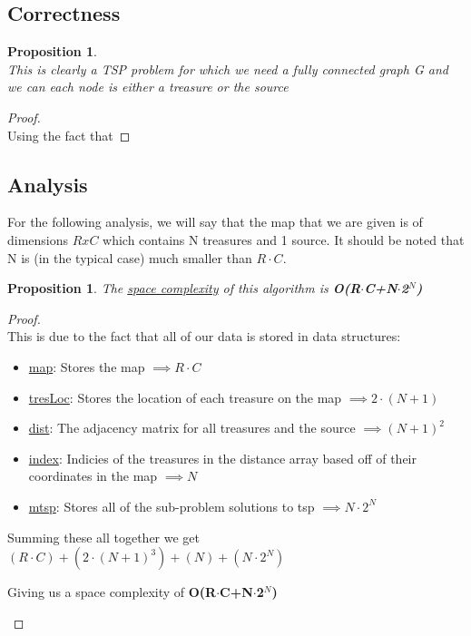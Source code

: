 \documentclass[12pt]{article}
\newtheorem{proposition}[theorem]{Proposition}
\begin{document}

\subsection{Correctness}
\begin{proposition}
~ \\ \indent This is clearly a TSP problem for which we need a fully connected graph G
and we can each node is either a treasure or the source
\end{proposition}

\begin{proof}
~ \\ \indent Using the fact that 
\end{proof}


\subsection{Analysis}
For the following analysis, we will say that the map that we are given is of dimensions
$RxC$ which contains N treasures and 1 source. It should be noted that N is (in the typical case)
much smaller than $R\cdot C$.


\begin{proposition}
\label{numq}
The \underline{space complexity} of this algorithm is \textbf{O(R$\cdot$C+N$\cdot$2$^N$)}
\end{proposition}

\begin{proof}
~ \\ \indent This is due to the fact that all of our data is stored in data structures:
\begin{itemize}
    \item \underline{map}: Stores the map $\implies R\cdot C$
    \item \underline{tresLoc}: Stores the location of each treasure on the map $\implies 2\cdot (N+1)$
    \item \underline{dist}: The adjacency matrix for all treasures and the source $\implies (N+1)^2$
    \item \underline{index}: Indicies of the treasures in the distance array based off of
            their coordinates in the map $\implies N$
    \item \underline{mtsp}: Stores all of the sub-problem solutions to tsp $\implies N\cdot 2^N$
\end{itemize}
Summing these all together we get $(R\cdot C) + (2\cdot(N+1)^3) + (N) + (N\cdot2^N)$
\begin{center}
    Giving us a space complexity of \textbf{O(R$\cdot$C+N$\cdot$2$^N$)}
\end{center}
\end{proof}
\end{document}

